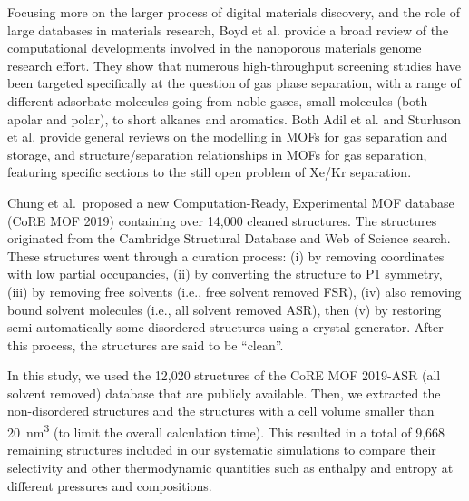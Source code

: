 \documentclass[main.tex]{subfiles}
\begin{document}
Focusing more on the larger process of digital materials discovery, and the role of large databases in materials research,\cite{Zhou_2019} Boyd et al.\cite{Boyd_2017} provide a broad review of the computational developments involved in the nanoporous materials genome research effort. They show that numerous high-throughput screening studies have been targeted specifically at the question of gas phase separation, with a range of different adsorbate molecules going from noble gases, small molecules (both apolar and polar), to short alkanes and aromatics. Both Adil et al.\cite{Adil_2017} and Sturluson et al.\cite{Sturluson_2019} provide general reviews on the modelling in MOFs for gas separation and storage, and structure/separation relationships in MOFs for gas separation, featuring specific sections to the still open problem of Xe/Kr separation.

Chung et al.\ proposed a new Computation-Ready, Experimental MOF database (CoRE MOF 2019) containing over 14,000 cleaned structures.\cite{Chung_2019} The structures originated from the Cambridge Structural Database and Web of Science search. These structures went through a curation process: (i) by removing coordinates with low partial occupancies, (ii) by converting the structure to P1 symmetry, (iii) by removing free solvents (i.e., free solvent removed FSR), (iv) also removing bound solvent molecules (i.e., all solvent removed ASR), then (v) by restoring semi-automatically some disordered structures using a crystal generator. After this process, the structures are said to be ``clean''.

In this study, we used the 12,020 structures of the CoRE MOF 2019-ASR (all solvent removed) database that are publicly available. Then, we extracted the non-disordered structures and the structures with a cell volume smaller than \SI{20}{\nano\meter\cubed} (to limit the overall calculation time). This resulted in a total of 9,668 remaining structures included in our systematic simulations to compare their selectivity and other thermodynamic quantities such as enthalpy and entropy at different pressures and compositions.

\end{document}
